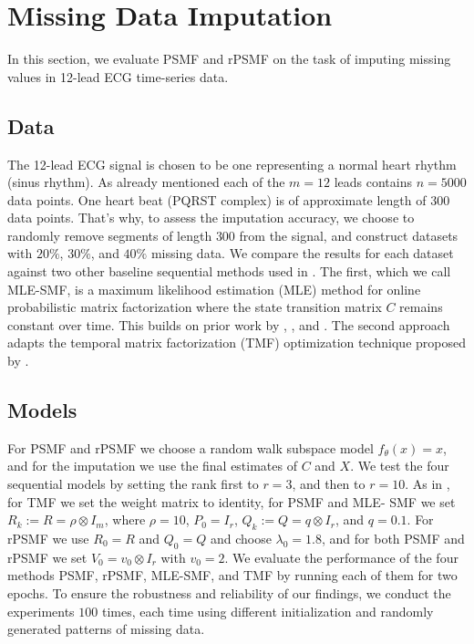 \documentclass{mldsmsc}
\begin{document}
\section{Missing Data Imputation}\label{sec:exp1}

In this section, we evaluate PSMF and rPSMF on the task of imputing missing values in 12-lead ECG time-series data. 

\subsection{Data}

The 12-lead ECG signal is chosen to be one representing a normal heart rhythm (sinus rhythm). As already mentioned each of the $m = 12$ leads contains $n = 5000$ data points. One heart beat (PQRST complex) is of approximate length of $300$ data points. That's why, to assess the imputation accuracy, we choose to randomly remove segments of length $300$ from the signal, and construct datasets with $20\%$, $30\%$, and $40\%$ missing data. We compare the results for each dataset against two other baseline sequential methods used in \cite{akyildiz2021probabilistic}. The first, which we call MLE-SMF, is a maximum likelihood estimation (MLE) method for online probabilistic matrix factorization where the state transition matrix $C$ remains constant over time. This builds on prior work by \cite{YILDIRIM2012494}, \cite{6288274}, and \cite{6638240}. The second approach adapts the temporal matrix factorization (TMF) optimization technique proposed by \cite{NIPS2016_85422afb}. \newline

\subsection{Models}

\noindent For PSMF and rPSMF we choose a random walk subspace model $f_{\theta}(x) = x$, and for the imputation we use the final estimates of $C$ and $X$. We test the four sequential models by setting the rank first to $r = 3$, and then to $r = 10$. As in \cite{akyildiz2021probabilistic}, for TMF we set the weight matrix to identity, for PSMF and MLE- SMF we set $R_k := R = \rho \otimes I_m$, where $\rho = 10$, $P_0 = I_r$, $Q_k := Q = q \otimes I_r$, and $q = 0.1$. For rPSMF we use $R_0 = R$ and $Q_0 = Q$ and choose $\lambda_0 = 1.8$, and for both PSMF and rPSMF we set $V_0 = v_0 \otimes I_r$ with $v_0 = 2$. We evaluate the performance of the four methods PSMF, rPSMF, MLE-SMF, and TMF by running each of them for two epochs. To ensure the robustness and reliability of our findings, we conduct the experiments $100$ times, each time using different initialization and randomly generated patterns of missing data. \newline
\end{document}
